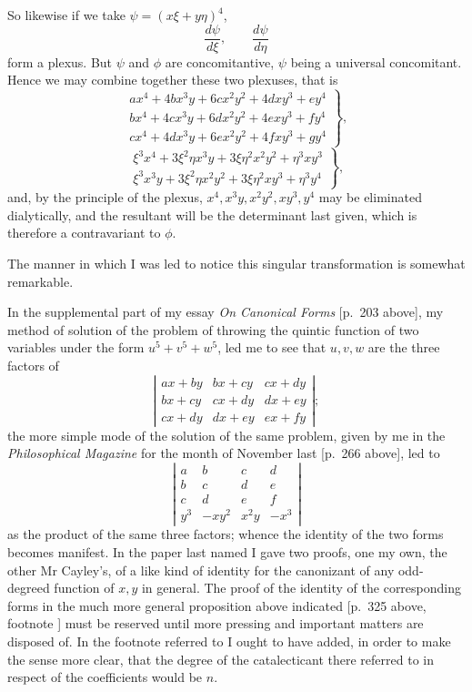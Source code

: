 \documentclass[11pt]{article}
\newcommand{\sourcepage}[1]{\marginpar{\scriptsize p.~#1}}
\begin{document}
\sourcepage{345}
So likewise if we take $\psi=(x\xi+y\eta)^4$,
\[
\frac{d\psi}{d\xi},\qquad \frac{d\psi}{d\eta}
\]
form a plexus. But $\psi$ and $\phi$ are concomitantive, $\psi$ being a universal concomitant. Hence we may combine together these two plexuses, that is
\[
\left.
\begin{array}{rrrrr}
ax^4+4bx^3y+6cx^2y^2+4dxy^3+ey^4\\
bx^4+4cx^3y+6dx^2y^2+4exy^3+fy^4\\
cx^4+4dx^3y+6ex^2y^2+4fxy^3+gy^4
\end{array}
\right\},
\]
\[
\left.
\begin{array}{rrrrr}
\xi^3x^4+3\xi^2\eta x^3y+3\xi\eta^2x^2y^2+\eta^3xy^3\\
\xi^3x^3y+3\xi^2\eta x^2y^2+3\xi\eta^2xy^3+\eta^3y^4
\end{array}
\right\},
\]
and, by the principle of the plexus, $x^4,x^3y,x^2y^2,xy^3,y^4$ may be eliminated dialytically, and the resultant will be the determinant last given, which is therefore a contravariant to $\phi$.

The manner in which I was led to notice this singular transformation is somewhat remarkable.

In the supplemental part of my essay \emph{On Canonical Forms} [p.~203 above], my method of solution of the problem of throwing the quintic function of two variables under the form $u^5+v^5+w^5$, led me to see that $u,v,w$ are the three factors of
\[
\left|\begin{array}{ccc}
ax+by&bx+cy&cx+dy\\
bx+cy&cx+dy&dx+ey\\
cx+dy&dx+ey&ex+fy
\end{array}\right|;
\]
the more simple mode of the solution of the same problem, given by me in the \emph{Philosophical Magazine} for the month of November last [p.~266 above], led to
\[
\left|\begin{array}{cccc}
a&b&c&d\\
b&c&d&e\\
c&d&e&f\\
y^3&-xy^2&x^2y&-x^3
\end{array}\right|
\]
as the product of the same three factors; whence the identity of the two forms becomes manifest. In the paper last named I gave two proofs, one my own, the other Mr Cayley's, of a like kind of identity for the canonizant of any odd-degreed function of $x,y$ in general. The proof of the identity of the corresponding forms in the much more general proposition above indicated [p.~325 above, footnote {\dag}] must be reserved until more pressing and important matters are disposed of. In the footnote referred to I ought to have added, in order to make the sense more clear, that the degree of the catalecticant there referred to in respect of the coefficients would be $n$.
\end{document}

